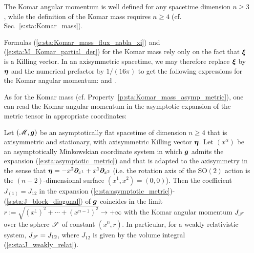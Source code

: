 \begin{remark}
The Komar angular momentum is well defined for any spacetime dimension $n\geq 3$, while the definition of the Komar mass requires
$n\geq 4$ (cf. Sec.~\ref{s:sta:Komar_mass}).
\end{remark}


Formulas (\ref{e:sta:Komar_mass_flux_nabla_xi}) and (\ref{e:sta:M_Komar_partial_der})
for the Komar mass rely only on the fact that $\bm{\xi}$ is a Killing vector.
In an axisymmetric spacetime, we may therefore replace $\bm{\xi}$ by $\bm{\eta}$
and the numerical prefactor by $1/(16\pi)$ to get the following expressions
for the Komar angular momentum:
\be \label{e:sta:J_Komar_cov_der}
\ee
and
\be \label{e:sta:J_Komar_partial_der}
     .
\ee

As for the Komar mass (cf. Property~\ref{p:sta:Komar_mass_asymp_metric}), one can read the
Komar angular momentum in the asymptotic expansion of the metric tensor in appropriate coordinates:

\begin{prop}
Let $(\mathscr{M},\bm{g})$ be an asymptotically flat spacetime of dimension $n\geq 4$ that is axisymmetric
and stationary, with axisymmetric Killing vector $\bm{\eta}$.
Let $(x^\alpha)$ be an asymptotically Minkowskian coordinate system
in which $\bm{g}$ admits the expansion (\ref{e:sta:asymptotic_metric})
and that is adapted to the axisymmetry in the sense
that $\bm{\eta} = - x^2 \bm{\partial}_{x^1} + x^1 \bm{\partial}_{x^2}$
(i.e. the rotation axis of the $\mathrm{SO}(2)$ action
is the $(n-2)$-dimensional surface $(x^1,x^2) = (0,0)$).
Then the coefficient $J_{(1)} = J_{12}$ in the expansion
(\ref{e:sta:asymptotic_metric})-(\ref{s:sta:J_block_diagonal}) of $\bm{g}$
coincides in the limit $r := \sqrt{(x^1)^2 + \cdots + (x^{n-1})^2} \to +\infty$ with
the Komar angular momentum $J_{\mathscr{S}}$ over the sphere $\mathscr{S}$
of constant $(x^0,r)$.
In particular, for a weakly relativistic system, $J_{\mathscr{S}} = J_{12}$,
where $J_{12}$ is given by the volume integral (\ref{e:sta:J_weakly_relat}).
\end{prop}

